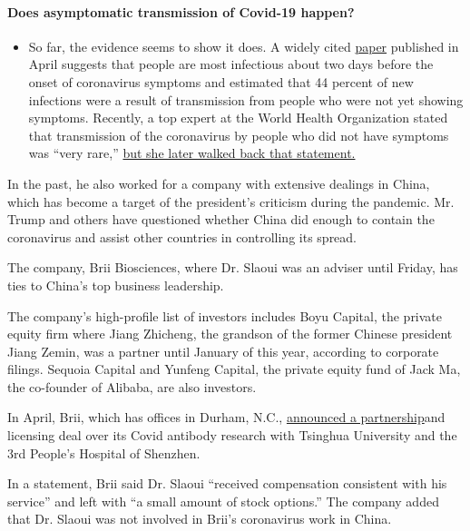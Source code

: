 \begin{itemize}
{  \paragraph{Does asymptomatic transmission of Covid-19
  happen?}\label{does-asymptomatic-transmission-of-covid-19-happen}}

  \begin{itemize}
  \tightlist
  \item
    So far, the evidence seems to show it does. A widely cited
    \href{https://www.nature.com/articles/s41591-020-0869-5}{paper}
    published in April suggests that people are most infectious about
    two days before the onset of coronavirus symptoms and estimated that
    44 percent of new infections were a result of transmission from
    people who were not yet showing symptoms. Recently, a top expert at
    the World Health Organization stated that transmission of the
    coronavirus by people who did not have symptoms was ``very rare,''
    \href{https://www.nytimes.com/2020/06/09/world/coronavirus-updates.html?action=click\&pgtype=Article\&state=default\&region=MAIN_CONTENT_3\&context=storylines_faq\#link-1f302e21}{but
    she later walked back that statement.}
  \end{itemize}
\end{itemize}

In the past, he also worked for a company with extensive dealings in
China, which has become a target of the president's criticism during the
pandemic. Mr. Trump and others have questioned whether China did enough
to contain the coronavirus and assist other countries in controlling its
spread.

The company, Brii Biosciences, where Dr. Slaoui was an adviser until
Friday, has ties to China's top business leadership.

The company's high-profile list of investors includes Boyu Capital, the
private equity firm where Jiang Zhicheng, the grandson of the former
Chinese president Jiang Zemin, was a partner until January of this year,
according to corporate filings. Sequoia Capital and Yunfeng Capital, the
private equity fund of Jack Ma, the co-founder of Alibaba, are also
investors.

In April, Brii, which has offices in Durham, N.C.,
\href{https://www.briibio.com/news/45.html}{announced a partnership}and
licensing deal over its Covid antibody research with Tsinghua University
and the 3rd People's Hospital of Shenzhen.

In a statement, Brii said Dr. Slaoui ``received compensation consistent
with his service'' and left with ``a small amount of stock options.''
The company added that Dr. Slaoui was not involved in Brii's coronavirus
work in China.

